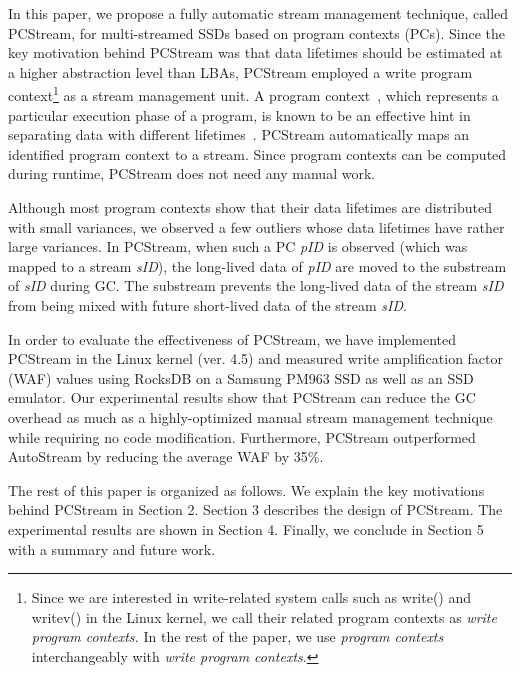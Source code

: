 In this paper, we propose a fully automatic stream management technique, called \textsf{\small PCStream}, 
for multi-streamed SSDs based on program contexts (PCs).
Since the key motivation behind \textsf{\small PCStream} was 
that data lifetimes should be estimated at a higher abstraction level than LBAs, 
\textsf{\small PCStream} employed a write program context\footnote{Since we are interested in write-related 
system calls such as write() and writev() in the Linux kernel, 
we call their related program contexts as 
{\it write program contexts.} In the rest of the paper, we use 
{\it program contexts} interchangeably with {\it write program contexts}.}  
as a stream management unit.
A program context~\cite{PC, PC2}, which represents a particular execution phase of a program, 
is known to be an effective hint in separating data with different lifetimes~\cite{PCHa}.  
\textsf{\small PCStream} automatically maps an identified program context to a stream.  
Since program contexts can be computed during runtime, 
\textsf{\small PCStream} does not need any manual work.   

Although most program contexts show that their data lifetimes are 
distributed with small variances, we observed a few outliers 
whose data lifetimes have rather large variances.
In \textsf{\small PCStream}, 
when such a PC {\it pID} is observed (which was mapped to a stream {\it sID}), 
the long-lived data of {\it pID} are moved to the substream of {\it sID}
during GC.  
The substream prevents the long-lived data of the stream {\it sID} 
from being mixed with future short-lived data of the stream {\it sID}.

In order to evaluate the effectiveness of \textsf{\small PCStream}, 
we have implemented \textsf{\small PCStream}
in the Linux kernel (ver. 4.5) and measured write amplification factor (WAF) values 
using RocksDB on a Samsung PM963 SSD 
as well as an SSD emulator.
Our experimental results show that \textsf{\small PCStream}
can reduce the GC overhead as much as a highly-optimized 
manual stream management technique while requiring no code modification.  
Furthermore, \textsf{\small PCStream} outperformed \textsf{\small AutoStream} by reducing the average WAF by 35\%.

The rest of this paper is organized as follows. 
We explain the key motivations behind \textsf{\small PCStream} in Section 2. 
Section 3 describes 
the design of \textsf{\small PCStream}.
The experimental results are shown in Section 4. 
Finally, we conclude in Section 5 with a summary and future work. 

